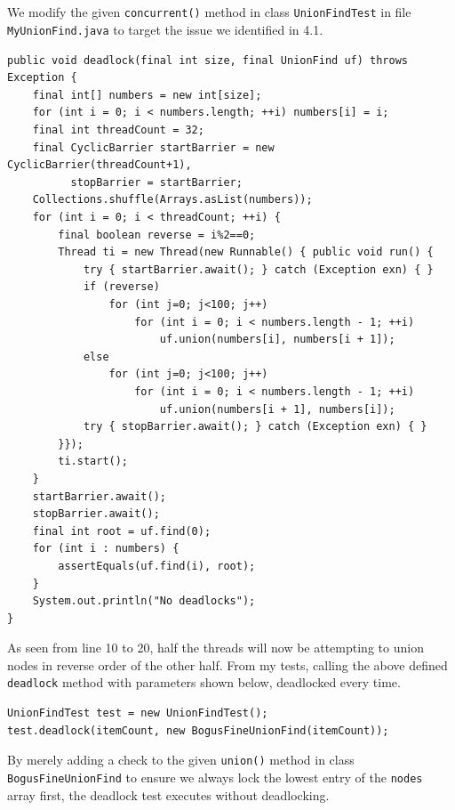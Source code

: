\documentclass[a5paper]{article}
\begin{document}
\subsection{}
We modify the given \texttt{concurrent()} method in class \texttt{UnionFindTest} in file \texttt{MyUnionFind.java} to target the issue we identified in 4.1.
\begin{lstlisting}
public void deadlock(final int size, final UnionFind uf) throws Exception {
    final int[] numbers = new int[size];
    for (int i = 0; i < numbers.length; ++i) numbers[i] = i;
    final int threadCount = 32;
    final CyclicBarrier startBarrier = new CyclicBarrier(threadCount+1), 
          stopBarrier = startBarrier;
    Collections.shuffle(Arrays.asList(numbers));
    for (int i = 0; i < threadCount; ++i) {
        final boolean reverse = i%2==0;
        Thread ti = new Thread(new Runnable() { public void run() {
            try { startBarrier.await(); } catch (Exception exn) { }
            if (reverse)
                for (int j=0; j<100; j++)
                    for (int i = 0; i < numbers.length - 1; ++i) 
                        uf.union(numbers[i], numbers[i + 1]);
            else 
                for (int j=0; j<100; j++)
                    for (int i = 0; i < numbers.length - 1; ++i) 
                        uf.union(numbers[i + 1], numbers[i]);
            try { stopBarrier.await(); } catch (Exception exn) { }
        }});
        ti.start();
    }
    startBarrier.await();
    stopBarrier.await();
    final int root = uf.find(0);
    for (int i : numbers) {
        assertEquals(uf.find(i), root);
    }
    System.out.println("No deadlocks");
}
\end{lstlisting}

As seen from line 10 to 20, half the threads will now be attempting to union nodes in reverse order of the other half.
From my tests, calling the above defined \texttt{deadlock} method with parameters shown below, deadlocked every time.

\begin{lstlisting}
UnionFindTest test = new UnionFindTest();
test.deadlock(itemCount, new BogusFineUnionFind(itemCount));
\end{lstlisting}

By merely adding a check to the given \texttt{union()} method in class \texttt{BogusFineUnionFind} to ensure we always lock the lowest entry of the \texttt{nodes} array first, the deadlock test
executes without deadlocking.
\end{document}
